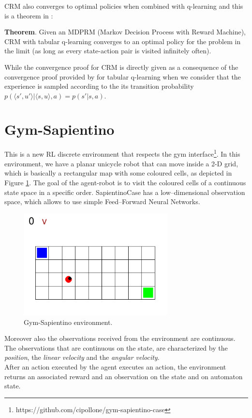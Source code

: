 \documentclass{article}
\begin{document}
CRM also converges to optimal policies when combined with q-learning and this is a theorem in \cite{icarte2020reward}:

\textbf{Theorem}. Given an MDPRM (Markov Decision Process with Reward Machine), CRM with tabular q-learning converges to an optimal policy for the problem in the limit (as long as every state-action pair is visited infinitely often).

While the convergence proof for CRM is directly given as a consequence of the convergence proof provided by \cite{watkins1992qlearn} for tabular q-learning when we consider that the experience is sampled according to the its transition probability $p(\langle s', u'\rangle|\langle s, u\rangle, a) = p(s'|s, a)$.

\section{Gym-Sapientino} %
This is a new RL discrete environment that respects the gym interface\footnote{https://github.com/cipollone/gym-sapientino-case}.
\noindent
In this environment, we have a planar unicycle robot that can move inside a 2-D grid, which is basically a rectangular map with some coloured cells, as depicted in Figure \ref{fig:sapientino_grid}. The goal of the agent-robot is to visit the coloured cells of a continuous state space in a specific order. SapientinoCase has a low–dimensional observation space, which allows to use simple Feed–Forward Neural Networks.

\begin{figure}[h]
    \centering
    \includegraphics[width=0.7\textwidth]{images/sapientino.png}
    \caption{Gym-Sapientino environment.}
    \label{fig:sapientino_grid}
\end{figure}

Moreover also the observations received from the environment are continuous. The observations that are continuous on the state, are characterized by the \textit{position}, the \textit{linear velocity} and  the \textit{angular velocity}. \\
After an action executed by the agent executes an action, the environment returns an associated reward and an observation on the state and on automaton state.
\end{document}

